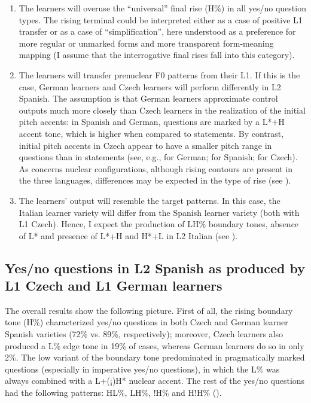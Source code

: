 \begin{enumerate}[label=H\arabic*,font=\PeskovaColonAfterItem]
\item\label{yn-h1}
 The learners will overuse the “universal” final rise (H\%) in all yes/no question types. The rising terminal could be interpreted either as a case of positive L1 transfer or as a case of “simplification”, here understood as a preference for more regular or unmarked forms and more transparent form-meaning mapping (I assume that the interrogative final rises fall into this category).

\item\label{yn-h2}
 The learners will transfer prenuclear F0 patterns from their L1. If this is the case, German learners and Czech learners will perform differently in L2 Spanish. The assumption is that German learners approximate control outputs much more closely than Czech learners in the realization of the initial pitch accents: in Spanish and German, questions are marked by a L*+H accent tone, which is higher when compared to statements. By contrast, initial pitch accents in Czech appear to have a smaller pitch range in questions than in statements (see, e.g., \citealt{PetroneNiebuhr2014} for German; \citealt{Face2005,Face2007} for Spanish; \citealt{PeškováEtAl2018} for Czech). As concerns nuclear configurations, although rising contours are present in the three languages, differences may be expected in the type of rise (see ).

\item\label{yn-h3}
 The learners’ output will resemble the target patterns. In this case, the Italian learner variety will differ from the Spanish learner variety (both with L1 Czech). Hence, I expect the production of LH\% boundary tones, absence of L* and presence of L*+H and H*+L in L2 Italian (see ).

\end{enumerate}

\subsection{Yes/no questions in L2 Spanish as produced by L1 Czech and L1 German learners}\label{sec:4.3.2}

The overall results show the following picture. First of all, the rising boundary tone (H\%) characterized yes/no questions in both Czech and German learner Spanish varieties (72\% vs. 89\%, respectively); moreover, Czech learners also produced a L\% edge tone in 19\% of cases, whereas German learners do so in only 2\%. The low variant of the boundary tone predominated in pragmatically marked questions (especially in imperative yes/no questions), in which the L\% was always combined with a L+(¡)H* nuclear accent. The rest of the yes/no questions had the following patterns: HL\%, LH\%, !H\% and H!H\% ().

